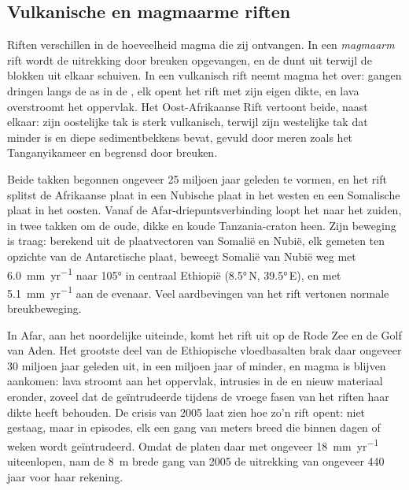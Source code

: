 \subsection*{Vulkanische en magmaarme riften}

Riften verschillen in de hoeveelheid magma die zij ontvangen. In een \emph{magmaarm} rift wordt de uitrekking door breuken opgevangen, en de  dunt uit terwijl de blokken uit elkaar schuiven. In een vulkanisch rift neemt magma het over: gangen dringen langs de as in de , elk opent het rift met zijn eigen dikte, en lava overstroomt het oppervlak. Het Oost-Afrikaanse Rift vertoont beide, naast elkaar: zijn oostelijke tak is sterk vulkanisch, terwijl zijn westelijke tak dat minder is en diepe sedimentbekkens bevat, gevuld door meren zoals het Tanganyikameer en begrensd door breuken.

Beide takken begonnen ongeveer 25 miljoen jaar geleden te vormen, en het rift splitst de Afrikaanse plaat in een Nubische plaat in het westen en een Somalische plaat in het oosten. Vanaf de Afar-driepuntsverbinding loopt het naar het zuiden, in twee takken om de oude, dikke en koude Tanzania-craton heen. Zijn beweging is traag: berekend uit de plaatvectoren van Somalië en Nubië, elk gemeten ten opzichte van de Antarctische plaat, beweegt Somalië van Nubië weg met \qty{6.0}{mm.yr^{-1}} naar \ang{105} in centraal Ethiopië (\ang{8.5}\,N, \ang{39.5}\,E), en met \qty{5.1}{mm.yr^{-1}} aan de evenaar. Veel aardbevingen van het rift vertonen normale breukbeweging.

In Afar, aan het noordelijke uiteinde, komt het rift uit op de Rode Zee en de Golf van Aden. Het grootste deel van de Ethiopische vloedbasalten brak daar ongeveer 30 miljoen jaar geleden uit, in een miljoen jaar of minder, en magma is blijven aankomen: lava stroomt aan het oppervlak, intrusies in de  en nieuw materiaal eronder, zoveel dat de geïntrudeerde  tijdens de vroege fasen van het riften haar dikte heeft behouden. De crisis van 2005 laat zien hoe zo'n rift opent: niet gestaag, maar in episodes, elk een gang van meters breed die binnen dagen of weken wordt geïntrudeerd. Omdat de platen daar met ongeveer \qty{18}{mm.yr^{-1}} uiteenlopen, nam de \qty{8}{m} brede gang van 2005 de uitrekking van ongeveer 440 jaar voor haar rekening.

